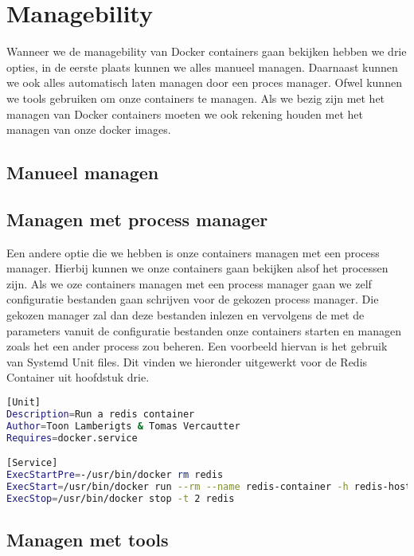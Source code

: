 \chapter{Managebility}

Wanneer we de managebility van Docker containers gaan bekijken hebben we drie opties, in de eerste plaats kunnen we alles manueel managen. Daarnaast kunnen we ook alles automatisch laten managen door een proces manager. Ofwel kunnen we tools gebruiken om onze containers te managen. Als we bezig zijn met het managen van Docker containers moeten we ook rekening houden met het managen van onze docker images. 

\section{Manueel managen}


\section{Managen met process manager}

Een andere optie die we hebben is onze containers managen met een process manager. Hierbij kunnen we onze containers gaan bekijken alsof het processen zijn. Als we oze containers managen met een process manager gaan we zelf configuratie bestanden gaan schrijven voor de gekozen process manager. Die gekozen manager zal dan deze bestanden inlezen en vervolgens de met de parameters vanuit de configuratie bestanden onze containers starten en managen zoals het een ander process zou beheren. Een voorbeeld hiervan is het gebruik van Systemd Unit files. Dit vinden we hieronder uitgewerkt voor de Redis Container uit hoofdstuk drie.

\begin{lstlisting}[language=bash, style=configstyle]
[Unit]
Description=Run a redis container
Author=Toon Lamberigts & Tomas Vercautter
Requires=docker.service

[Service]
ExecStartPre=-/usr/bin/docker rm redis
ExecStart=/usr/bin/docker run --rm --name redis-container -h redis-host redis
ExecStop=/usr/bin/docker stop -t 2 redis
\end{lstlisting}

\section{Managen met tools}